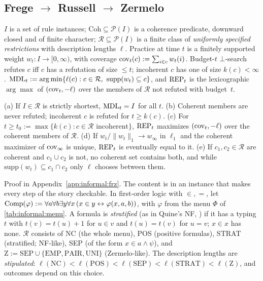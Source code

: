 \subsection{Frege \texorpdfstring{$\to$}{->} Russell \texorpdfstring{$\to$}{->} Zermelo}\label{sec:informal:frz}

\begin{definition}\label{def:informal:repair}
$I$ is a set of rule instances; $\mathrm{Coh}\subseteq\mathcal P(I)$ is a coherence predicate, downward closed and of finite character; $\mathcal R\subseteq\mathcal P(I)$ is a finite class of \emph{uniformly specified restrictions} with description lengths $\ell$. Practice at time $t$ is a finitely supported weight $w_t:I\to[0,\infty)$, with coverage $\mathrm{cov}_t(c):=\sum_{i\in c}w_t(i)$. Budget-$t$ $\bot$-search refutes $c$ iff $c$ has a refutation of size $\le t$; incoherent $c$ has one of size $k(c)<\infty$. $\MDL_t:=\arg\min\{\ell(c):c\in\mathcal R,\ \mathrm{supp}(w_t)\subseteq c\}$, and $\mathrm{REP}_t$ is the lexicographic $\arg\max$ of $(\mathrm{cov}_t,-\ell)$ over the members of $\mathcal R$ not refuted with budget~$t$.
\end{definition}

\begin{theorem}\label{thm:informal:repair}
(a) If $I\in\mathcal R$ is strictly shortest, $\mathrm{MDL}_t=I$ for all $t$. (b) Coherent members are never refuted; incoherent $c$ is refuted for $t\ge k(c)$. (c) For $t\ge t_0:=\max\{k(c):c\in\mathcal R\text{ incoherent}\}$, $\mathrm{REP}_t$ maximizes $(\mathrm{cov}_t,-\ell)$ over the coherent members of $\mathcal R$. (d) If $w_t/\|w_t\|_1\to w_\infty$ in $\ell_1$ and the coherent maximizer of $\mathrm{cov}_\infty$ is unique, $\mathrm{REP}_t$ is eventually equal to it. (e) If $c_1,c_2\in\mathcal R$ are coherent and $c_1\cup c_2$ is not, no coherent set contains both, and while $\mathrm{supp}(w_t)\subseteq c_1\cap c_2$ only $\ell$ chooses between them.
\end{theorem}

Proof in Appendix~\ref{app:informal:frz}. The content is in an instance that makes every step of the story checkable. In first-order logic with $\in,=$, let $\mathrm{Comp}(\varphi):=\forall a\forall b\exists y\forall x\,(x\in y\leftrightarrow\varphi(x,a,b))$, with $\varphi$ from the menu $\Phi$ of \cref{tab:informal:menu}. A formula is \emph{stratified} (as in Quine's NF, \citealt{quine1937new}) if it has a typing $t$ with $t(v)=t(u)+1$ for $u\in v$ and $t(u)=t(v)$ for $u=v$; $x\in x$ has none. $\mathcal R$ consists of NC (the whole menu), POS (positive formulas), STRAT (stratified; NF-like), SEP (of the form $x\in a\wedge\psi$), and $\mathrm Z:=\mathrm{SEP}\cup\{\mathrm{EMP},\mathrm{PAIR},\mathrm{UNI}\}$ (Zermelo-like). The description lengths are \emph{stipulated}: $\ell(\mathrm{NC})<\ell(\mathrm{POS})<\ell(\mathrm{SEP})<\ell(\mathrm{STRAT})<\ell(\mathrm Z)$, and outcomes depend on this choice.


